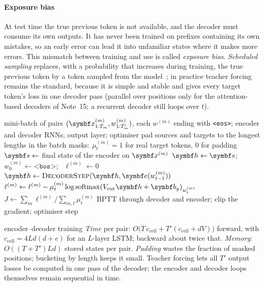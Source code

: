 \documentclass[11pt]{article}
\newcommand{\hv}{\vect{h}}
\newcommand{\bv}{\vect{b}}
\newcommand{\ev}{\vect{e}}
\newcommand{\softmax}{\operatorname{softmax}}
\newcommand{\bos}{\texttt{<bos>}}
\newcommand{\eos}{\texttt{<eos>}}
\begin{document}
\paragraph{Exposure bias} At test time the true previous token is not available, and the decoder must consume its own
outputs. It has never been trained on prefixes containing its own mistakes, so an early error can lead it into
unfamiliar states where it makes more errors. This mismatch between training and use is called \emph{exposure bias}.
\emph{Scheduled sampling} replaces, with a probability that increases during training, the true previous token by a token
sampled from the model~\cite{bengio2015}; in practice teacher forcing remains the standard, because it is simple and
stable and gives every target token's loss in one decoder pass (parallel over positions only for the attention-based
decoders of Note~15; a recurrent decoder still loops over $t$).

\begin{algorithm}[htbp]
\caption{One training step of an encoder--decoder with teacher forcing}\label{alg:seq2seq}
\begin{algorithmic}[1]
\Require mini-batch of pairs $(\x^{(m)}_{1:T_m}, w^{(m)}_{1:T'_m})$, each $w^{(m)}$ ending with \eos; encoder and decoder
  RNNs; output layer; optimiser
  \State pad sources and targets to the longest lengths in the batch
  \State masks: $\mu^{(m)}_t = 1$ for real target tokens, $0$ for padding
    \State $\vect{s} \gets$ final state of the encoder on $\x^{(m)}$ 
    \State $\hv \gets \vect{s}$; \ $w^{(m)}_0 \gets \bos$; \ $\ell^{(m)} \gets 0$
      \State $\hv \gets \textsc{DecoderStep}(\hv, \ev(w^{(m)}_{t-1}))$ 
      \State $\ell^{(m)} \gets \ell^{(m)} - \mu^{(m)}_t\log\softmax(V_{\mathrm{out}}\hv + \bv_y)_{w^{(m)}_t}$
    \EndFor
  \EndFor
  \State $J \gets \sum_m \ell^{(m)} \big/ \sum_{m,t}\mu^{(m)}_t$ 
  \State BPTT through decoder and encoder; clip the gradient; optimiser step
\EndFunction
\end{algorithmic}
\end{algorithm}

\begin{runtime}{encoder--decoder training}
\emph{Time} per pair: $O\big(T\,c_{\mathrm{cell}} + T'(c_{\mathrm{cell}} + dV)\big)$ forward, with $c_{\mathrm{cell}} = 4Ld(d + e)$
for an $L$-layer LSTM; backward about twice that. \emph{Memory}: $O((T + T')Ld)$ stored states per pair. \emph{Padding}
wastes the fraction of masked positions; bucketing by length keeps it small. Teacher forcing lets all $T'$ output
losses be computed in one pass of the decoder; the encoder and decoder loops themselves remain sequential in time.
\end{runtime}
\end{document}
